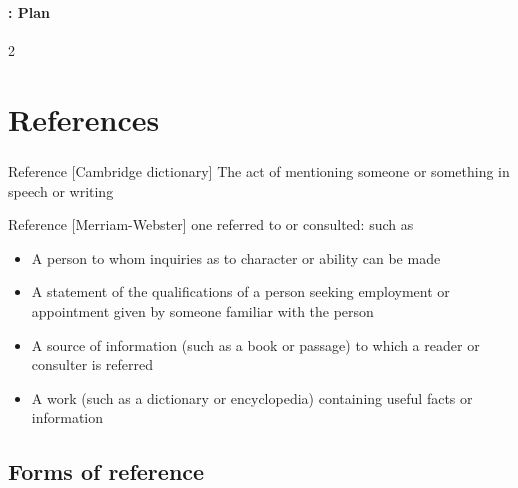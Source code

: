 \documentclass[xcolor=table]{beamer}
\begin{document}
\begin{frame}
	\frametitle{\inserttitle}
	\framesubtitle{\insertshortsubtitle: Plan}

	\begin{multicols}{2}
	\tableofcontents
	\end{multicols}

\end{frame}

\section{References}

\begin{frame}
	\frametitle{\insertshortsubtitle}
	\framesubtitle{\insertsection}
	
	\begin{block}{Reference [Cambridge dictionary]}
		The act of mentioning someone or something in speech or writing
	\end{block}
	
	\begin{block}{Reference [Merriam-Webster]}
		one referred to or consulted: such as
		\begin{itemize}
			\item A person to whom inquiries as to character or ability can be made
			\item A statement of the qualifications of a person seeking employment or appointment given by someone familiar with the person
			\item A source of information (such as a book or passage) to which a reader or consulter is referred
			\item A work (such as a dictionary or encyclopedia) containing useful facts or information
		\end{itemize}
	\end{block}
	
\end{frame}

\subsection{Forms of reference}
\end{document}
